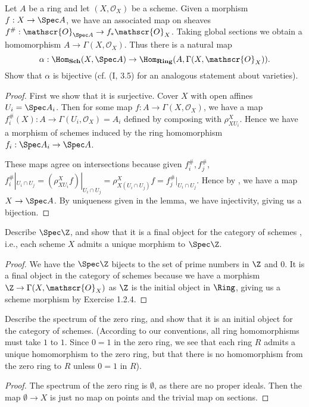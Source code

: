 \begin{exercise}%
	Let $A $ be a ring and let $(X,\mathscr{O}_X) $ be a scheme. Given a morphism $f: X\to \Spec A $, we have an associated map on sheaves $f^\#: \mathscr{O}_{\Spec A} \to f_\ast \mathscr{O}_X $. Taking global sections we obtain a homomorphism $A\to \Gamma(X,\mathscr{O}_X) $. Thus there is a natural map
	\[
		\alpha: \Hom_{\text{\textbf{Sch}}}(X,\Spec A) \to \Hom_{\text{\textbf{Ring}}}(A,\Gamma(X,\mathscr{O}_X))
	.\] 
	Show that $\alpha $ is bijective (cf. (I, 3.5) for an analogous statement about varieties).
\end{exercise}
\begin{proof}
	First we show that it is surjective.
	Cover $X $ with open affines $U_i = \Spec A_i $.
	Then for some map $f: A\to \Gamma(X,\mathscr{O}_X) $, we have a map $f^\#_i(X):A\to \Gamma(U_i, \mathscr{O}_X) = A_i $ defined by composing with $\rho^X_{XU_i} $.
	Hence we have a morphism of schemes induced by the ring homomorphism $f_i: \Spec A_i \to \Spec A $.

	These maps agree on intersections because given $f_i^\#,f_j^\# $, $f_i^\#|_{U_i \cap U_j} = (\rho^X_{X U_i}f)|_{U_i\cap U_j} = \rho^X_{X (U_i\cap U_j)}f = f_j^\#|_{U_i\cap U_j}$.
	Hence by , we have a map $X\to \Spec A $.
	By uniqueness given in the lemma, we have injectivity, giving us a bijection.
\end{proof}

\begin{exercise}%
	Describe $\Spec \Z $, and show that it is a final object for the category of schemes , i.e., each scheme $X $ admits a unique morphism to $\Spec \Z $.
\end{exercise}
\begin{proof}
	We have the $\Spec \Z $ bijects to the set of prime numbers in $\Z $ and $0 $.
	It is a final object in the category of schemes because we have a morphism $\Z \to \Gamma(X, \mathscr{O}_X) $ as $\Z $ is the initial object in $\Ring $, giving us a scheme morphism by Exercise 1.2.4.
\end{proof}

\begin{exercise}
	Describe the spectrum of the zero ring, and show that it is an initial object for the category of schemes. (According to our conventions, all ring homomorphisms must take $1 $ to $1 $. Since $0 = 1 $ in the zero ring, we see that each ring $R $ admits a unique homomorphism to the zero ring, but that there is no homomorphism from the zero ring to $R $ unless $0=1 $ in $R $).
\end{exercise}
\begin{proof}
	The spectrum of the zero ring is $\emptyset $, as there are no proper ideals.
	Then the map $\emptyset \to X $ is just no map on points and the trivial map on sections.
\end{proof}

